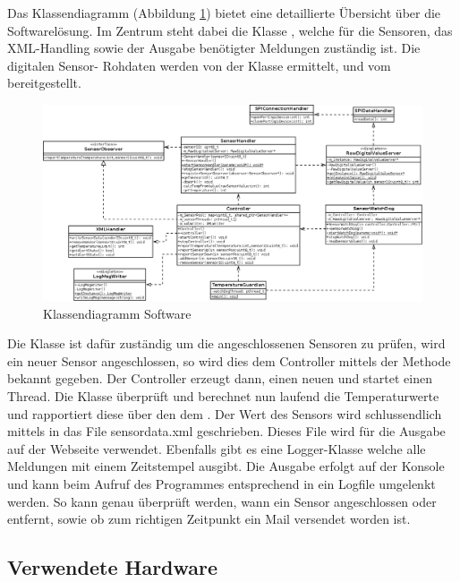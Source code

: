 Das Klassendiagramm (Abbildung \ref{fig:classdia}) bietet eine detaillierte Übersicht über die Softwarelösung. Im Zentrum steht dabei die Klasse , welche für die Sensoren, das XML-Handling sowie der Ausgabe benötigter Meldungen zuständig ist. Die digitalen Sensor- Rohdaten werden von der Klasse  ermittelt, und vom  bereitgestellt.

\begin{figure}[H]%
\centering
\includegraphics[width=1\textwidth]{Images/Klassendiagramm.png}
\caption{Klassendiagramm Software}
\label{fig:classdia}
\end{figure}

Die Klasse  ist dafür zuständig um die angeschlossenen Sensoren zu prüfen, wird ein neuer Sensor angeschlossen, so wird dies dem Controller mittels der Methode  bekannt gegeben. Der Controller erzeugt dann, einen neuen  und startet einen Thread. Die Klasse  überprüft und berechnet nun laufend die Temperaturwerte und rapportiert diese über den  dem . Der Wert des Sensors wird schlussendlich mittels  in das File sensordata.xml geschrieben. Dieses File wird für die Ausgabe auf der Webseite verwendet.
Ebenfalls gibt es eine Logger-Klasse welche alle Meldungen mit einem Zeitstempel ausgibt. Die Ausgabe erfolgt auf der Konsole und kann beim Aufruf des Programmes entsprechend in ein Logfile umgelenkt werden. So kann genau überprüft werden, wann ein Sensor angeschlossen oder entfernt, sowie ob zum richtigen Zeitpunkt ein Mail versendet worden ist. 

\subsection{Verwendete Hardware}

